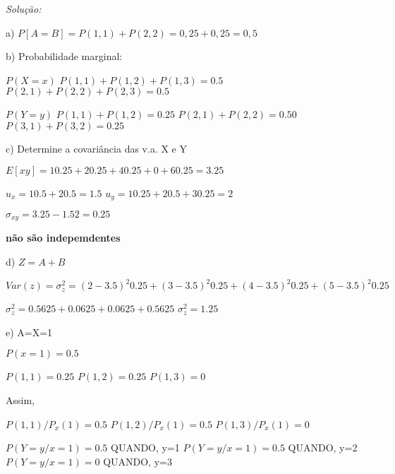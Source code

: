 \documentclass{article}
\newenvironment{solution}
    {\textit{Solução:}}
    {}
\begin{document}
\begin{solution}



a) $P[A=B] = P(1,1) + P(2,2) = 0,25 + 0,25 = 0,5$

b) Probabilidade marginal:

$P(X=x)$
$P(1,1) + P(1,2) + P(1,3) = 0.5$
$P(2,1) + P(2,2) + P(2,3) = 0.5$

$P(Y=y)$
$P(1,1) + P(1,2)  = 0.25$
$P(2,1) + P(2,2)  = 0.50$
$P(3,1) + P(3,2)  = 0.25$

c) Determine a covariância das v.a. X e Y

$E[xy] = 1 0.25 + 2 0.25 + 4 0.25 + 0 + 6 0.25 = 3.25$

$u_{x} = 1 0.5 + 2 0.5 = 1.5$
$u_{y} = 1 0.25 + 2 0.5 + 3 0.25 = 2$

$\sigma_{xy} = 3.25 - 1.5 2 = 0.25$

\textbf{não são indepemdentes}

d) $Z=A+B$

$Var(z) = \sigma_{z}^{2} = (2-3.5)^{2} 0.25 + (3-3.5)^{2} 0.25 + (4-3.5)^{2} 0.25 + (5-3.5)^{2} 0.25$

$\sigma_{z}^{2} = 0.5625 + 0.0625 + 0.0625 + 0.5625$
$\sigma_{z}^{2} = 1.25$

e) A=X=1

$P(x=1) = 0.5$

$P(1,1) = 0.25$
$P(1,2) = 0.25$
$P(1,3) = 0$

Assim,

$P(1,1)/P_{x}(1) = 0.5$
$P(1,2)/P_{x}(1) = 0.5$
$P(1,3)/P_{x}(1) = 0$

$P(Y=y/x=1) = 0.5$ QUANDO, y=1
$P(Y=y/x=1) = 0.5$ QUANDO, y=2
$P(Y=y/x=1) = 0$ QUANDO, y=3

\end{solution}
\end{document}
